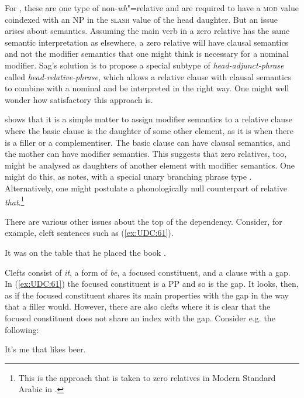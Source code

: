 \documentclass[output=paper
                ,modfonts
                ,nonflat
	        ,collection
	        ,collectionchapter
	        ,collectiontoclongg
 	        ,biblatex
                ,babelshorthands
                ,newtxmath
                ,draftmode
                ,colorlinks, citecolor=brown
]{./langsci/langscibook}
\begin{document}
{\noindent
For \citet{Sag:97}, these are one type of non-\emph{wh}"=relative and are
required to have a \textsc{mod} value coindexed with an NP in the \textsc{slash} value of
the head daughter. But an issue arises about semantics. Assuming the
main verb in a zero relative has the same semantic interpretation as
elsewhere, a zero relative will have clausal semantics and not the
modifier semantics that one might think is necessary for a nominal
modifier. Sag's solution is to propose a special subtype of
\emph{head-adjunct-phrase} called \emph{head-relative-phrase}, which
allows a relative clause with clausal semantics to combine with a
nominal and be interpreted in the right way. One might well wonder how
satisfactory this approach is.

\citet{Sag:10a} shows that it is a simple matter to assign modifier semantics
to a relative clause where the basic clause is the daughter of some
other element, as it is when there is a filler or a complementiser. The
basic clause can have clausal semantics, and the mother can have modifier
semantics. This suggests that zero relatives, too, might be analysed as
daughters of another element with modifier semantics. One might do this,
as \citet[531]{Sag:10a} notes, with a special unary branching phrase
type \citep[Section~10.3.2]{Mueller99a}.
Alternatively, one might postulate a phonologically null counterpart of
relative \emph{that}.\footnote{This is the approach that is taken to
  zero relatives in Modern Standard Arabic in \citet{Alqurashi:Borsley:12}.}

There are various other issues about the top of the dependency.
Consider, for example, cleft sentences such as (\ref{ex:UDC:61}).

\begin{exe}
\ex \label{ex:UDC:61}
 It was on the table that he placed the book \trace{}.
\end{exe}

\noindent
Clefts consist of \emph{it}, a form of \emph{be}, a focused constituent,
and a clause with a gap. In (\ref{ex:UDC:61}) the focused constituent is a PP and so
is the gap. It looks, then, as if the focused constituent shares its
main properties with the gap in the way that a filler would. However,
there are also clefts where it is clear that the focused constituent
does not share an index with the gap. Consider e.g. the following:

\begin{exe}
\ex \label{ex:UDC:62}
It's me that \trace{} likes beer.
\end{exe}

}
\end{document}
